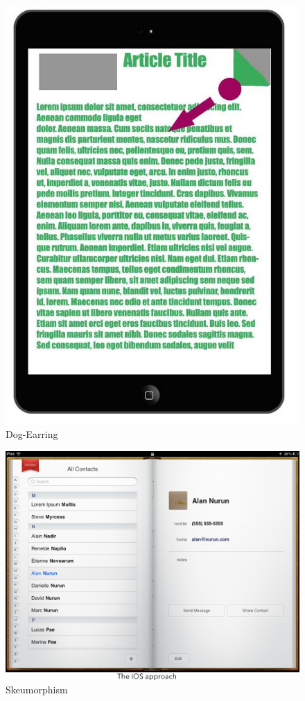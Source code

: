 \documentclass[11pt, oneside]{article}   	%
\begin{document}
\begin{figure}[!hb]
    \centering
    \includegraphics[scale=0.3]{dog-ear.jpg}
    \caption{Dog-Earring}
    \label{fig:dog-earring}
\end{figure}

\begin{figure}[!hb]
    \centering
    \includegraphics[scale=0.3]{apple-skeu.png}
    \caption{Skeumorphism}
    \label{fig:apple-skeu}
\end{figure}
\end{document}
